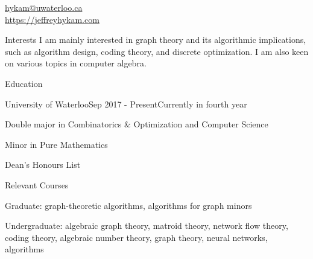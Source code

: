 \documentclass{cv}
\begin{document}

\href{hykam@uwaterloo.ca}{hykam@uwaterloo.ca} \\
\href{https://jeffreyhykam.com}{https://jeffreyhykam.com}

\begin{rSection}{Interests}
	I am mainly interested in graph theory and its algorithmic implications, such as algorithm design, coding theory, and discrete optimization. 
	I am also keen on various topics in computer algebra.
\end{rSection}

\begin{rSection}{Education}
\begin{rSubsection}{University of Waterloo}{Sep 2017 - Present}{Currently in fourth year}{}
	\item Double major in Combinatorics \& Optimization and Computer Science
	\item Minor in Pure Mathematics
	\item Dean's Honours List
\end{rSubsection}

\begin{rSubsection}{Relevant Courses}{}{}{}
	\item Graduate: graph-theoretic algorithms, algorithms for graph minors
	\item Undergraduate: algebraic graph theory, matroid theory, network flow theory, coding theory, algebraic number theory, graph theory, neural networks, algorithms
\end{rSubsection}


\end{rSection}
\end{document}
